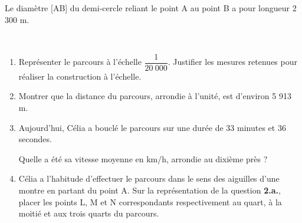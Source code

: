 \begin{enumerate}
    \begin{minipage}{5cm}
        Le diamètre [AB] du demi-cercle reliant le point A au point B a pour longueur 2 300 m.
    \end{minipage}
     \hspace{1cm}
    \begin{minipage}{10cm}
    \end{minipage}
    \medskip
    \begin{enumerate}
        \item Représenter le parcours à l’échelle $\dfrac{1}{20~000}$. Justifier les mesures retenues pour réaliser
        la construction à l’échelle.
        \item Montrer que la distance du parcours, arrondie à l’unité, est d’environ 5 913 m.
        \item Aujourd’hui, Célia a bouclé le parcours sur une durée de 33 minutes et 36 secondes.
                
        Quelle a été sa vitesse moyenne en km/h, arrondie au dixième près ?
        \item Célia a l'habitude d'effectuer le parcours dans le sens des aiguilles d'une montre en
        partant du point A. Sur la représentation de la question \textbf{2.a.}, placer les points L, M et
        N correspondants respectivement au quart, à la moitié et aux trois quarts du parcours.
    \end{enumerate}
\end{enumerate}